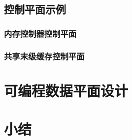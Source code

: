 \subsection{控制平面示例}

\subsubsection{内存控制器控制平面}

\subsubsection{共享末级缓存控制平面}


\section{可编程数据平面设计}


\section{小结}


